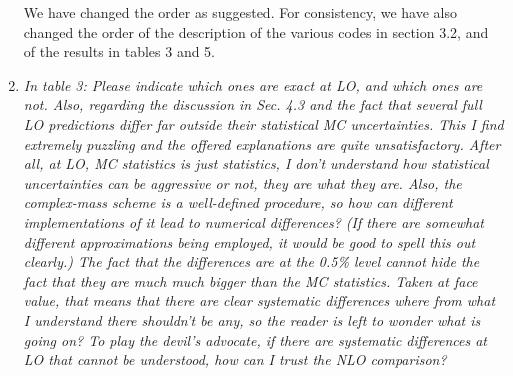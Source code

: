 \documentclass{report}
\begin{document}
\begin{enumerate}
We have changed the order as suggested.
For consistency, we have also changed the order of the description of the various codes in section 3.2, and of the
results in tables 3 and 5.

\item \emph{In table 3: Please indicate which ones are exact at LO, and which ones are not. Also, regarding the discussion in Sec. 4.3 and the fact that several full LO
predictions differ far outside their statistical MC uncertainties. This I find
extremely puzzling and the offered explanations are quite unsatisfactory. After
all, at LO, MC statistics is just statistics, I don't understand how statistical
uncertainties can be aggressive or not, they are what they are.
Also, the complex-mass scheme is a well-defined procedure, so how can different implementations of it lead to numerical differences? (If there are somewhat different approximations being employed, it would be good to spell this out clearly.) The fact that the differences are at the 0.5\% level
cannot hide the fact that they are much much bigger than the MC statistics.
Taken at face value, that means that there are clear systematic differences where from what I understand there shouldn't be any, so the reader is left to wonder what is going on? To play the devil's advocate, if there are systematic differences at LO that cannot be understood, how can I trust the NLO comparison?}


\end{enumerate}
\end{document}
